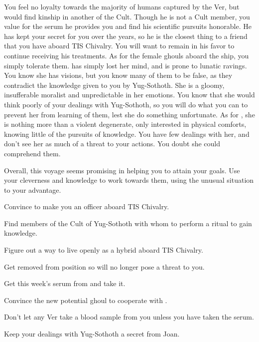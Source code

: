 \documentclass[char]{guildcamp4}
\begin{document}
You feel no loyalty towards the majority of humans captured by the Ver, but would find kinship in another of the Cult. Though he is not a Cult member, you value \cJames{} for the serum he provides you and find his scientific pursuits honorable. He has kept your secret for you over the years, so he is the closest thing to a friend that you have aboard TIS Chivalry. You will want to remain in his favor to continue receiving his treatments. As for the female ghouls aboard the ship, you simply tolerate them. \cJoan{} has simply lost her mind, and is prone to lunatic ravings. You know she has visions, but you know many of them to be false, as they contradict the knowledge given to you by Yug-Sothoth. She is a gloomy, insufferable moralist and unpredictable in her emotions. You know that she would think poorly of your dealings with Yug-Sothoth, so you will do what you can to prevent her from learning of them, lest she do something unfortunate. As for \cJulie{}, she is nothing more than a violent degenerate, only interested in physical comforts, knowing little of the pursuits of knowledge. You have few dealings with her, and don't see her as much of a threat to your actions. You doubt she could comprehend them.

Overall, this voyage seems promising in helping you to attain your goals. Use your cleverness and knowledge to work towards them, using the unusual situation to your advantage.

\begin{itemz}[Goals]
	\item Convince \cVone{} to make you an officer aboard TIS Chivalry.
	\item Find members of the Cult of Yug-Sothoth with whom to perform a ritual to gain knowledge.
	\item Figure out a way to live openly as a hybrid aboard TIS Chivalry.
	\item Get \cVthree{} removed from \cVthree{\their} position so \cVthree{\they} will no longer pose a threat to you.
	\item Get this week's serum from \cJames{} and take it.
	\item Convince the new potential ghoul to cooperate with \cVone{}.
	\item Don't let any Ver take a blood sample from you unless you have taken the serum.
	\item Keep your dealings with Yug-Sothoth a secret from Joan.
\end{itemz}

\begin{itemz}[Notes]
	\item 
\end{itemz}
\end{document}
